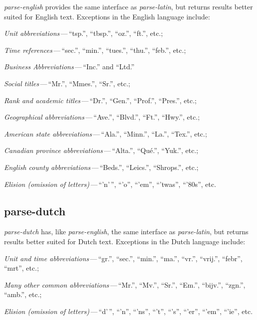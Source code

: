 \emph{parse-english} provides the same interface as \emph{parse-latin}, but
  returns results better suited for English text.
Exceptions in the English language include:

\begin{aenumerate}
\item \emph{Unit abbreviations}\,---\,``tsp.'', ``tbsp.'', ``oz.'', ``ft.'',
  etc.;
\item\emph{Time references}\,---\,``sec.'', ``min.'', ``tues.'', ``thu.'',
  ``feb.'', etc.;
\item\emph{Business Abbreviations}\,---\,``Inc.'' and ``Ltd.''
\item\emph{Social titles}\,---\,``Mr.'', ``Mmes.'', ``Sr.'', etc.;
\item\emph{Rank and academic titles}\,---\,``Dr.'', ``Gen.'', ``Prof.'',
  ``Pres.'', etc.;
\item\emph{Geographical abbreviations}\,---\,``Ave.'', ``Blvd.'', ``Ft.'',
  ``Hwy.'', etc.;
\item\emph{American state abbreviations}\,---\,``Ala.'', ``Minn.'', ``La.'',
  ``Tex.'', etc.;
\item\emph{Canadian province abbreviations}\,---\,``Alta.'', ``Qué.'',
  ``Yuk.'', etc.;
\item\emph{English county abbreviations}\,---\,``Beds.'', ``Leics.'',
  ``Shrops.'', etc.;
\item\emph{Elision (omission of letters)}\,---\,``'n'\,'', ``'o'', ``'em'',
  ``'twas'', ``'80s'', etc.
\end{aenumerate}

\subsection{parse-dutch}\label{parse-dutch}

\emph{parse-dutch} has, like \emph{parse-english}, the same interface as
  \emph{parse-latin}, but returns results better suited for Dutch text.
Exceptions in the Dutch language include:

\begin{aenumerate}
\item\emph{Unit and time abbreviations}\,---\,``gr.'', ``sec.'', ``min.'', ``ma.'',
  ``vr.'', ``vrij.'', ``febr'', ``mrt'', etc.;
\item\emph{Many other common abbreviations}\,---\,``Mr.'', ``Mv.'', ``Sr.'',
  ``Em.'', ``bijv.'', ``zgn.'', ``amb.'', etc.;
\item\emph{Elision (omission of letters)}\,---\,``d'\,'', ``'n'', ``'ns'',
  ``'t'', ``'s'', ``'er'', ``'em'', ``'ie'', etc.
\end{aenumerate}

